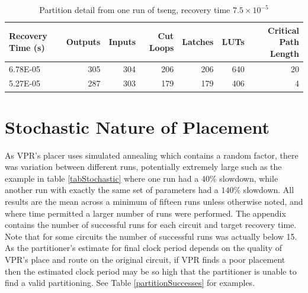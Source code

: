 \documentclass[12pt,final,oneside,a4paper]{dwThesis} %
\begin{document}
   \begin{table}
      \begin{center}

      \begin{tabular}
         {lrrrrrr} \toprule Recovery Time (s) &
         Outputs & Inputs & Cut Loops & Latches & \glspl{LUT} & Critical
         Path Length\\
         \midrule 6.78E-05 & 305 & 304 & 206 & 206 & 640 &
         20\\
         5.27E-05 & 287 & 303 & 179 & 179 & 406 & 4\\
         \bottomrule

      \end{tabular}
      \caption{Partition detail from one run of tseng,
         recovery time $7.5\times10^{-5}$}\label{tabSanityPartitions}

   \end{center}\end{table}



   \section{Stochastic Nature of Placement}\label{stochastic}
   As \gls{VPR}'s placer uses
   simulated annealing which contains a random factor, there was variation
   between different runs, potentially extremely large such as the example in
   table \ref{tabStochastic} where one run had a $40\%$ slowdown, while another
   run with exactly the same set of parameters had a $140\%$ slowdown.
   All results are the mean across a minimum of fifteen runs unless otherwise noted, and where time permitted a larger number of runs were performed.
   The appendix contains the number of successful runs for each circuit and target recovery time.
   Note that for some circuits the number of successful runs was actually below 15.
   As the partitioner's estimate for final clock period depends on the quality of \gls{VPR}'s place and route on the original circuit,
   if \gls{VPR} finds a poor placement then the estimated clock period may be so high that the partitioner is unable to find a valid partitioning.
   See Table \ref{partitionSuccesses} for examples.
   
\end{document}
